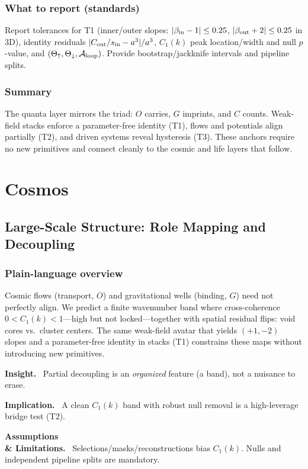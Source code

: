 \documentclass[12pt,a4paper,oneside]{scrreprt}
\newenvironment{insight}{\par\vspace{0.5em}\noindent\textbf{Insight.}\ }{\par\vspace{0.5em}}
\newenvironment{implication}{\par\vspace{0.5em}\noindent\textbf{Implication.}\ }{\par\vspace{0.5em}}
\newenvironment{limitation}{\par\vspace{0.5em}\noindent\textbf{Assumptions \\ \& Limitations.}\ }{\par\vspace{0.5em}}
\begin{document}
\section{What to report (standards)}\label{sec:quanta-report}
Report tolerances for T1 (inner/outer slopes: $|\beta_{\rm in}-1|\le 0.25$, $|\beta_{\rm out}+2|\le 0.25$ in 3D), identity residuals $|C_{\rm out}/s_{\rm in}-a^3|/a^3$, $C_1(k)$ peak location/width and null $p$-value, and $(\Theta_\uparrow,\Theta_\downarrow,\mathcal A_{\rm loop})$. Provide bootstrap/jackknife intervals and pipeline splits.

\section*{Summary}
The quanta layer mirrors the triad: $O$ carries, $G$ imprints, and $C$ counts. Weak-field stacks enforce a parameter-free identity (T1), flows and potentials align partially (T2), and driven systems reveal hysteresis (T3). These anchors require no new primitives and connect cleanly to the cosmic and life layers that follow.

\part{Cosmos}

\chapter{Large-Scale Structure: Role Mapping and Decoupling}\label{ch:lss-role}

\section*{Plain-language overview}
Cosmic flows (transport, $O$) and gravitational wells (binding, $G$) need not perfectly align. 
We predict a finite wavenumber band where cross-coherence $0<C_1(k)<1$—high but not locked—together with spatial residual flips: void cores vs.\ cluster centers. 
The same weak-field avatar that yields $(+1,-2)$ slopes and a parameter-free identity in stacks (T1) constrains these maps without introducing new primitives.

\begin{insight}
Partial decoupling is an \emph{organized} feature (a band), not a nuisance to erase.
\end{insight}
\begin{implication}
A clean $C_1(k)$ band with robust null removal is a high-leverage bridge test (T2).
\end{implication}
\begin{limitation}
Selections/masks/reconstructions bias $C_1(k)$. Nulls and independent pipeline splits are mandatory.

\end{limitation}
\end{document}
